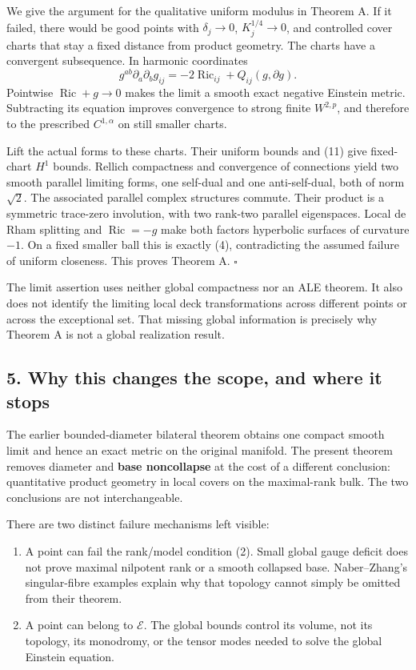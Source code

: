 \documentclass[
  11pt,
]{article}
\providecommand{\tightlist}{%
  \setlength{\itemsep}{0pt}\setlength{\parskip}{0pt}}
\begin{document}
We give the argument for the qualitative uniform modulus in Theorem A.
If it failed, there would be good points with \(\delta_j\to0\),
\(K_j^{1/4}\to0\), and controlled cover charts that stay a fixed
distance from product geometry. The charts have a convergent
subsequence. In harmonic coordinates \[
 g^{ab}\partial_a\partial_b g_{ij}
            =-2\operatorname{Ric}_{ij}+Q_{ij}(g,\partial g).
 \tag{12}
\] Pointwise \(\operatorname{Ric}+g\to0\) makes the limit a smooth exact
negative Einstein metric. Subtracting its equation improves convergence
to strong finite \(W^{2,p}\), and therefore to the prescribed
\(C^{1,\alpha}\) on still smaller charts.

Lift the actual forms to these charts. Their uniform bounds and (11)
give fixed-chart \(H^1\) bounds. Rellich compactness and convergence of
connections yield two smooth parallel limiting forms, one self-dual and
one anti-self-dual, both of norm \(\sqrt2\). The associated parallel
complex structures commute. Their product is a symmetric trace-zero
involution, with two rank-two parallel eigenspaces. Local de Rham
splitting and \(\operatorname{Ric}=-g\) make both factors hyperbolic
surfaces of curvature \(-1\). On a fixed smaller ball this is exactly
(4), contradicting the assumed failure of uniform closeness. This proves
Theorem A. \(\square\)

The limit assertion uses neither global compactness nor an ALE theorem.
It also does not identify the limiting local deck transformations across
different points or across the exceptional set. That missing global
information is precisely why Theorem A is not a global realization
result.

\hypertarget{why-this-changes-the-scope-and-where-it-stops}{%
\subsection{5. Why this changes the scope, and where it
stops}\label{why-this-changes-the-scope-and-where-it-stops}}

The earlier bounded-diameter bilateral theorem obtains one compact
smooth limit and hence an exact metric on the original manifold. The
present theorem removes diameter and \textbf{base noncollapse} at the
cost of a different conclusion: quantitative product geometry in local
covers on the maximal-rank bulk. The two conclusions are not
interchangeable.

There are two distinct failure mechanisms left visible:

\begin{enumerate}
\def\labelenumi{\arabic{enumi}.}
\tightlist
\item
  A point can fail the rank/model condition (2). Small global gauge
  deficit does not prove maximal nilpotent rank or a smooth collapsed
  base. Naber--Zhang's singular-fibre examples explain why that topology
  cannot simply be omitted from their theorem.
\item
  A point can belong to \(\mathcal E\). The global bounds control its
  volume, not its topology, its monodromy, or the tensor modes needed to
  solve the global Einstein equation.
\end{enumerate}
\end{document}
